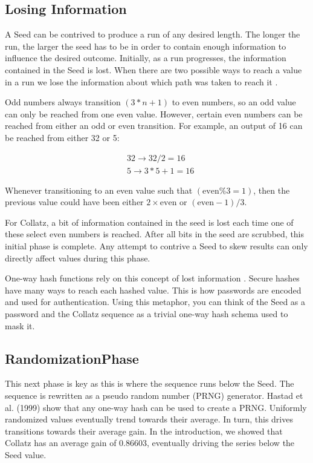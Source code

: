 \documentclass[letterpaper]{article}
\begin{document}
\begin{multicols}{2}
    \subsection{Losing Information}
    A Seed can be contrived to produce a run of any desired length. The longer the run, the larger the seed has to be in order to contain enough information to influence the desired outcome. Initially, as a run progresses, the information contained in the Seed is lost. When there are two possible ways to reach a value in a run we lose the information about which path was taken to reach it \cite{2}.

    Odd numbers always transition $(3*n + 1)$ to even numbers, so an odd value can only be reached from one even value. However, certain even numbers can be reached from either an odd or even transition. For example, an output of 16 can be reached from either 32 or 5:

    \[
        \begin{aligned}
             & 32 \rightarrow 32 / 2 = 16 \\
             & 5 \rightarrow 3*5 + 1 = 16
        \end{aligned}
    \]

    Whenever transitioning to an even value such that $(\text{even} \% 3 = 1)$, then the previous value could have been either $2 \times \text{even}$ or $(\text{even} - 1) / 3$.

    For Collatz, a bit of information contained in the seed is lost each time one of these select even numbers is reached. After all bits in the seed are scrubbed, this initial phase is complete. Any attempt to contrive a Seed to skew results can only directly affect values during this phase.

    One-way hash functions rely on this concept of lost information \cite{3}. Secure hashes have many ways to reach each hashed value. This is how passwords are encoded and used for authentication. Using this metaphor, you can think of the Seed as a password and the Collatz sequence as a trivial one-way hash schema used to mask it.

    \subsection{RandomizationPhase}

    This next phase is key as this is where the sequence runs below the Seed. The sequence is rewritten as a pseudo random number (PRNG) generator. Hastad et al. (1999) \cite{4} show that any one-way hash can be used to create a PRNG. Uniformly randomized values eventually trend towards their average. In turn, this drives transitions towards their average gain. In the introduction, we showed that Collatz has an average gain of $0.86603$, eventually driving the series below the Seed value.


\end{multicols}
\end{document}
